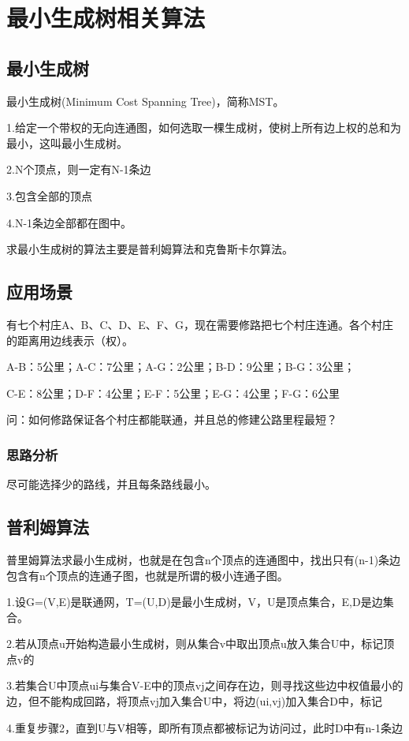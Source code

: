 \documentclass[a4paper]{report}
\begin{document}
\section{最小生成树相关算法}
\subsection{最小生成树}
最小生成树(Minimum Cost Spanning Tree)，简称MST。

1.给定一个带权的无向连通图，如何选取一棵生成树，使树上所有边上权的总和为最小，这叫最小生成树。

2.N个顶点，则一定有N-1条边

3.包含全部的顶点

4.N-1条边全部都在图中。

求最小生成树的算法主要是普利姆算法和克鲁斯卡尔算法。

\subsection{应用场景}
有七个村庄A、B、C、D、E、F、G，现在需要修路把七个村庄连通。各个村庄的距离用边线表示（权）。

A-B：5公里；A-C：7公里；A-G：2公里；B-D：9公里；B-G：3公里；

C-E：8公里；D-F：4公里；E-F：5公里；E-G：4公里；F-G：6公里

问：如何修路保证各个村庄都能联通，并且总的修建公路里程最短？

\subsubsection{思路分析}
尽可能选择少的路线，并且每条路线最小。
\subsection{普利姆算法}
普里姆算法求最小生成树，也就是在包含n个顶点的连通图中，找出只有(n-1)条边包含有n个顶点的连通子图，也就是所谓的极小连通子图。

1.设G=(V,E)是联通网，T=(U,D)是最小生成树，V，U是顶点集合，E,D是边集合。

2.若从顶点u开始构造最小生成树，则从集合v中取出顶点u放入集合U中，标记顶点v的


3.若集合U中顶点ui与集合V-E中的顶点vj之间存在边，则寻找这些边中权值最小的边，但不能构成回路，将顶点vj加入集合U中，将边(ui,vj)加入集合D中，标记

4.重复步骤2，直到U与V相等，即所有顶点都被标记为访问过，此时D中有n-1条边
\end{document}
